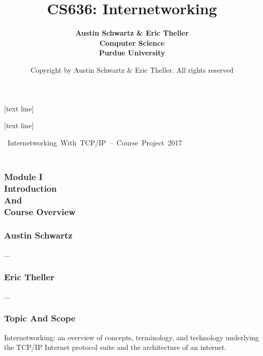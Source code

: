 \documentclass[professionalfonts, t, aspectratio=1610]{beamer}
\title{\textbf{CS636: Internetworking}}
\date[ISPN ’80]{Copyright \textcopyright 2017 by Austin Schwartz \& Eric Theller. All rights reserved}
\author[Comer]{\textbf{Austin Schwartz \& Eric Theller \\ Computer Science \\ Purdue University}}
\begin{document}
{
  [text line]{%
    \parbox{\linewidth}{
      \vspace*{-28pt}
      \centering\insertdate
    }
  }
  \begin{frame}
    \titlepage
  \end{frame}
}

\addtocounter{framenumber}{-1}

[text line]{%
  \parbox{\linewidth}{
    \vspace*{-16pt}
  \hbox{%
    Internetworking With TCP/IP – Course Project
      \insertsectionnavigationhorizontal{.185\paperwidth}{}{}%
   \insertframenumber
      \insertsectionnavigationhorizontal{.4\paperwidth}{}{}%
    2017
    }
    \vspace{0.1cm}
  \hspace*{\fill}%
    \insertdate
  \hspace*{\fill}\vskip2pt%
  }
}

\begin{frame}
\frametitle{ %
\bigskip \bigskip \bigskip \bigskip \bigskip \bigskip \\
Module I \\ \bigskip
Introduction\\
And\\
Course Overview} 
\end{frame}

\begin{frame} 
\frametitle{Austin Schwartz}
...
\end{frame}

\begin{frame} 
\frametitle{Eric Theller}
...
\end{frame}

\begin{frame} 
\frametitle{Topic And Scope} 
\bigskip
\bigskip
\bigskip
Internetworking: an overview of concepts, terminology, and technology underlying the TCP/IP Internet protocol suite and the architecture of an internet.
\end{frame}
\end{document}
